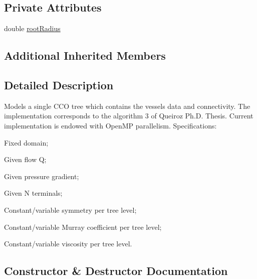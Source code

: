 \subsection*{Private Attributes}
\begin{DoxyCompactItemize}
\item 
double \hyperlink{class_f_r_r_c_c_o_s_tree_a7cbf3091db38b3b573b84be820890bba}{root\+Radius}
\end{DoxyCompactItemize}
\subsection*{Additional Inherited Members}


\subsection{Detailed Description}
Models a single C\+CO tree which contains the vessel\textquotesingle{}s data and connectivity. The implementation corresponds to the algorithm 3 of Queiroz Ph.\+D. Thesis. Current implementation is endowed with Open\+MP parallelism. Specifications\+:
\begin{DoxyItemize}
\item Fixed domain;
\item Given flow Q;
\item Given pressure gradient;
\item Given N terminals;
\item Constant/variable symmetry per tree level;
\item Constant/variable Murray coefficient per tree level;
\item Constant/variable viscosity per tree level. 
\end{DoxyItemize}

\subsection{Constructor \& Destructor Documentation}
